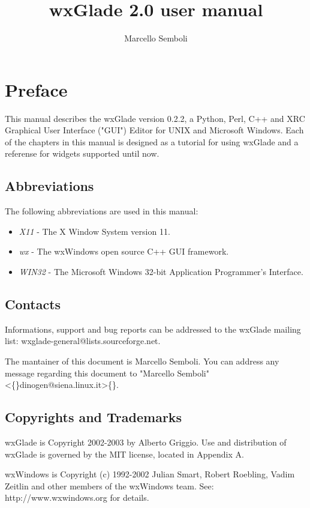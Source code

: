 \documentclass[a4paper,10pt]{report}
\title{wxGlade 2.0 user manual}
\author{Marcello Semboli}
\begin{document}
\maketitle
\tableofcontents

\chapter{Preface}
This manual describes the wxGlade version 0.2.2, a Python, Perl,  C++
and XRC Graphical User Interface ("GUI") Editor for UNIX and
Microsoft Windows. Each of the chapters in this manual is designed
as a tutorial for using wxGlade and a referense for widgets
supported until now.


\section{Abbreviations}
The following abbreviations are used in this manual:

\begin{itemize}
\item
\emph{X11} - The X Window System version 11.
\item
\emph{wx} - The wxWindows open source C++ GUI framework.
\item
\emph{WIN32} - The Microsoft Windows 32-bit Application Programmer's Interface.
\end{itemize}

\section{Contacts}
Informations, support and bug reports can be addressed to the
wxGlade mailing list:
wxglade-general@lists.sourceforge.net.

The mantainer of this document is Marcello Semboli.
You can address any message regarding this document to "Marcello
Semboli" \textless\{\}dinogen@siena.linux.it\textgreater\{\}.

\section{Copyrights and Trademarks}
wxGlade is Copyright 2002-2003 by Alberto Griggio. Use and distribution
of wxGlade is governed by the MIT license, located in Appendix A.

wxWindows is Copyright (c) 1992-2002 Julian Smart, Robert Roebling,
Vadim Zeitlin and other members of the wxWindows team.
See: http://www.wxwindows.org for details.
\end{document}
